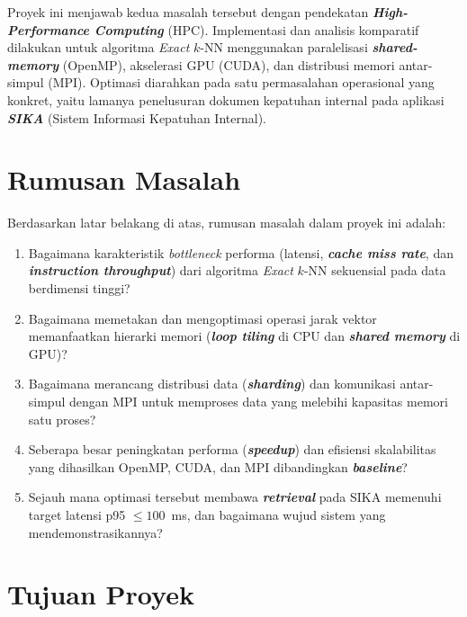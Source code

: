 \documentclass[12pt,a4paper,oneside]{report}
\newcommand{\keyword}[1]{\textbf{\textit{#1}}}
\begin{document}
Proyek ini menjawab kedua masalah tersebut dengan pendekatan \keyword{High-Performance Computing} (HPC). Implementasi dan analisis komparatif dilakukan untuk algoritma \textit{Exact} $k$-NN menggunakan paralelisasi \keyword{shared-memory} (OpenMP), akselerasi GPU (CUDA), dan distribusi memori antar-simpul (MPI). Optimasi diarahkan pada satu permasalahan operasional yang konkret, yaitu lamanya penelusuran dokumen kepatuhan internal pada aplikasi \keyword{SIKA} (Sistem Informasi Kepatuhan Internal).

\section{Rumusan Masalah}

Berdasarkan latar belakang di atas, rumusan masalah dalam proyek ini adalah:
\begin{enumerate}[leftmargin=2em]
  \item Bagaimana karakteristik \textit{bottleneck} performa (latensi, \keyword{cache miss rate}, dan \keyword{instruction throughput}) dari algoritma \textit{Exact} $k$-NN sekuensial pada data berdimensi tinggi?
  \item Bagaimana memetakan dan mengoptimasi operasi jarak vektor memanfaatkan hierarki memori (\keyword{loop tiling} di CPU dan \keyword{shared memory} di GPU)?
  \item Bagaimana merancang distribusi data (\keyword{sharding}) dan komunikasi antar-simpul dengan MPI untuk memproses data yang melebihi kapasitas memori satu proses?
  \item Seberapa besar peningkatan performa (\keyword{speedup}) dan efisiensi skalabilitas yang dihasilkan OpenMP, CUDA, dan MPI dibandingkan \keyword{baseline}?
  \item Sejauh mana optimasi tersebut membawa \keyword{retrieval} pada SIKA memenuhi target latensi p95 $\leq 100$~ms, dan bagaimana wujud sistem yang mendemonstrasikannya?
\end{enumerate}

\section{Tujuan Proyek}
\end{document}
